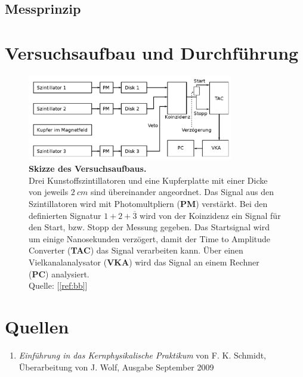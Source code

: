 \documentclass[a4paper,ngerman]{scrartcl}
\begin{document}
\subsection{Messprinzip}
\label{sec:messprinzip}
\clearpage

\section{Versuchsaufbau und Durchführung}


\begin{figure}[tb!]
  \centering
  \includegraphics[width=0.8\textwidth]{abbildungen/aufbau_skizze.png}
  \caption{\textbf{Skizze des Versuchsaufbaus.} 
  \\ 
  Drei Kunstoffszintillatoren und eine Kupferplatte mit einer Dicke von jeweils $\SI{2}{cm}$ sind übereinander angeordnet. 	Das Signal aus den Szintillatoren wird mit Photomultpliern (\textbf{PM}) verstärkt. Bei den definierten Signatur $1 + 2 + \overline{3}$ wird von der Koinzidenz ein Signal für den Start, bzw. Stopp der Messung gegeben. Das Startsignal wird um einige Nanosekunden verzögert, damit der Time to Amplitude Converter (\textbf{TAC}) das Signal verarbeiten kann. Über einen Vielkanalanalysator (\textbf{VKA}) wird das Signal an einem Rechner (\textbf{PC}) analysiert.
  \\Quelle: [\ref{ref:bb}]}
  \label{fig:blmaufbau}
\end{figure}




\clearpage
\section{Quellen}
\begin{enumerate}
\item \emph{Einführung in das Kernphysikalische Praktikum} von F. K. Schmidt, 
  Überarbeitung von J. Wolf, Ausgabe September 2009 \label{ref:bb}
\end{enumerate}
\end{document}
